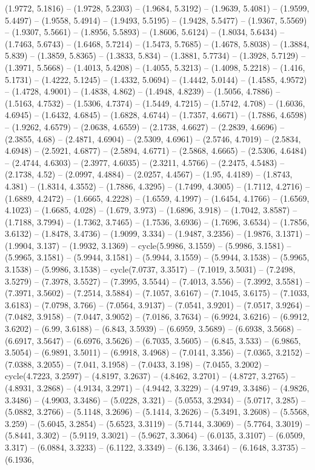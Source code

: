 (1.9772, 5.1816) -- (1.9728, 5.2303) -- (1.9684, 5.3192) -- (1.9639, 5.4081) -- (1.9599, 5.4497) -- (1.9558, 5.4914) -- (1.9493, 5.5195) -- (1.9428, 5.5477) -- (1.9367, 5.5569) -- (1.9307, 5.5661) -- (1.8956, 5.5893) -- (1.8606, 5.6124) -- (1.8034, 5.6434) -- (1.7463, 5.6743) -- (1.6468, 5.7214) -- (1.5473, 5.7685) -- (1.4678, 5.8038) -- (1.3884, 5.839) -- (1.3859, 5.8365) -- (1.3833, 5.834) -- (1.3881, 5.7734) -- (1.3928, 5.7129) -- (1.3971, 5.5668) -- (1.4013, 5.4208) -- (1.4055, 5.3213) -- (1.4098, 5.2218) -- (1.416, 5.1731) -- (1.4222, 5.1245) -- (1.4332, 5.0694) -- (1.4442, 5.0144) -- (1.4585, 4.9572) -- (1.4728, 4.9001) -- (1.4838, 4.862) -- (1.4948, 4.8239) -- (1.5056, 4.7886) -- (1.5163, 4.7532) -- (1.5306, 4.7374) -- (1.5449, 4.7215) -- (1.5742, 4.708) -- (1.6036, 4.6945) -- (1.6432, 4.6845) -- (1.6828, 4.6744) -- (1.7357, 4.6671) -- (1.7886, 4.6598) -- (1.9262, 4.6579) -- (2.0638, 4.6559) -- (2.1738, 4.6627) -- (2.2839, 4.6696) -- (2.3855, 4.68) -- (2.4871, 4.6904) -- (2.5309, 4.6961) -- (2.5746, 4.7019) -- (2.5834, 4.6948) -- (2.5921, 4.6877) -- (2.5894, 4.6771) -- (2.5868, 4.6665) -- (2.5306, 4.6484) -- (2.4744, 4.6303) -- (2.3977, 4.6035) -- (2.3211, 4.5766) -- (2.2475, 4.5483) -- (2.1738, 4.52) -- (2.0997, 4.4884) -- (2.0257, 4.4567) -- (1.95, 4.4189) -- (1.8743, 4.381) -- (1.8314, 4.3552) -- (1.7886, 4.3295) -- (1.7499, 4.3005) -- (1.7112, 4.2716) -- (1.6889, 4.2472) -- (1.6665, 4.2228) -- (1.6559, 4.1997) -- (1.6454, 4.1766) -- (1.6569, 4.1023) -- (1.6685, 4.028) -- (1.679, 3.973) -- (1.6896, 3.918) -- (1.7042, 3.8587) -- (1.7188, 3.7994) -- (1.7362, 3.7465) -- (1.7536, 3.6936) -- (1.7696, 3.6534) -- (1.7856, 3.6132) -- (1.8478, 3.4736) -- (1.9099, 3.334) -- (1.9487, 3.2356) -- (1.9876, 3.1371) -- (1.9904, 3.137) -- (1.9932, 3.1369) -- cycle(5.9986, 3.1559) -- (5.9986, 3.1581) -- (5.9965, 3.1581) -- (5.9944, 3.1581) -- (5.9944, 3.1559) -- (5.9944, 3.1538) -- (5.9965, 3.1538) -- (5.9986, 3.1538) -- cycle(7.0737, 3.3517) -- (7.1019, 3.5031) -- (7.2498, 3.5279) -- (7.3978, 3.5527) -- (7.3995, 3.5544) -- (7.4013, 3.556) -- (7.3992, 3.5581) -- (7.3971, 3.5602) -- (7.2514, 3.5884) -- (7.1057, 3.6167) -- (7.1045, 3.6175) -- (7.1033, 3.6183) -- (7.0798, 3.766) -- (7.0564, 3.9137) -- (7.0541, 3.9201) -- (7.0517, 3.9264) -- (7.0482, 3.9158) -- (7.0447, 3.9052) -- (7.0186, 3.7634) -- (6.9924, 3.6216) -- (6.9912, 3.6202) -- (6.99, 3.6188) -- (6.843, 3.5939) -- (6.6959, 3.5689) -- (6.6938, 3.5668) -- (6.6917, 3.5647) -- (6.6976, 3.5626) -- (6.7035, 3.5605) -- (6.845, 3.533) -- (6.9865, 3.5054) -- (6.9891, 3.5011) -- (6.9918, 3.4968) -- (7.0141, 3.356) -- (7.0365, 3.2152) -- (7.0388, 3.2055) -- (7.041, 3.1958) -- (7.0433, 3.198) -- (7.0455, 3.2002) -- cycle(4.7223, 3.2597) -- (4.8197, 3.2637) -- (4.8462, 3.2701) -- (4.8727, 3.2765) -- (4.8931, 3.2868) -- (4.9134, 3.2971) -- (4.9442, 3.3229) -- (4.9749, 3.3486) -- (4.9826, 3.3486) -- (4.9903, 3.3486) -- (5.0228, 3.321) -- (5.0553, 3.2934) -- (5.0717, 3.285) -- (5.0882, 3.2766) -- (5.1148, 3.2696) -- (5.1414, 3.2626) -- (5.3491, 3.2608) -- (5.5568, 3.259) -- (5.6045, 3.2854) -- (5.6523, 3.3119) -- (5.7144, 3.3069) -- (5.7764, 3.3019) -- (5.8441, 3.302) -- (5.9119, 3.3021) -- (5.9627, 3.3064) -- (6.0135, 3.3107) -- (6.0509, 3.317) -- (6.0884, 3.3233) -- (6.1122, 3.3349) -- (6.136, 3.3464) -- (6.1648, 3.3735) -- (6.1936, 